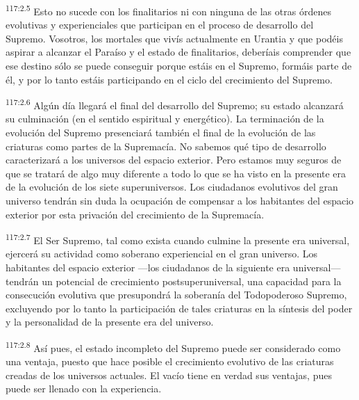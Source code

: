 \documentclass[twoside, 11pt]{book}
\begin{document}
\par
\textsuperscript{117:2.5} Esto no sucede con los finalitarios ni con ninguna de las otras órdenes evolutivas y experienciales que participan en el proceso de desarrollo del Supremo. Vosotros, los mortales que vivís actualmente en Urantia y que podéis aspirar a alcanzar el Paraíso y el estado de finalitarios, deberíais comprender que ese destino sólo se puede conseguir porque estáis en el Supremo, formáis parte de él, y por lo tanto estáis participando en el ciclo del crecimiento del Supremo.

\par
\textsuperscript{117:2.6} Algún día llegará el final del desarrollo del Supremo; su estado alcanzará su culminación (en el sentido espiritual y energético). La terminación de la evolución del Supremo presenciará también el final de la evolución de las criaturas como partes de la Supremacía. No sabemos qué tipo de desarrollo caracterizará a los universos del espacio exterior. Pero estamos muy seguros de que se tratará de algo muy diferente a todo lo que se ha visto en la presente era de la evolución de los siete superuniversos. Los ciudadanos evolutivos del gran universo tendrán sin duda la ocupación de compensar a los habitantes del espacio exterior por esta privación del crecimiento de la Supremacía.

\par
\textsuperscript{117:2.7} El Ser Supremo, tal como exista cuando culmine la presente era universal, ejercerá su actividad como soberano experiencial en el gran universo. Los habitantes del espacio exterior ---los ciudadanos de la siguiente era universal--- tendrán un potencial de crecimiento postsuperuniversal, una capacidad para la consecución evolutiva que presupondrá la soberanía del Todopoderoso Supremo, excluyendo por lo tanto la participación de tales criaturas en la síntesis del poder y la personalidad de la presente era del universo.

\par
\textsuperscript{117:2.8} Así pues, el estado incompleto del Supremo puede ser considerado como una ventaja, puesto que hace posible el crecimiento evolutivo de las criaturas creadas de los universos actuales. El vacío tiene en verdad sus ventajas, pues puede ser llenado con la experiencia.
\end{document}
